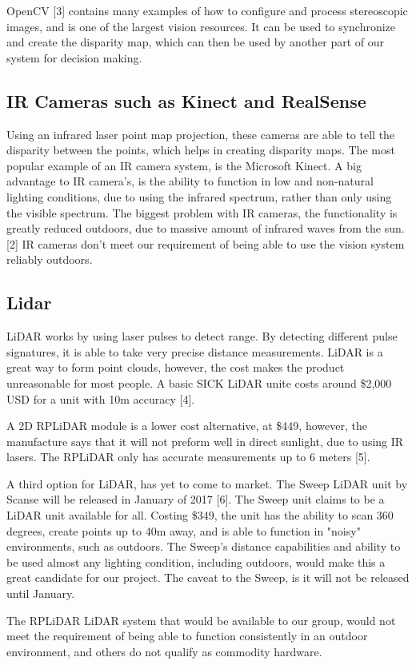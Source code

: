 \documentclass[compsoc,draftclsnofoot,onecolumn,10pt]{IEEEtran}
\begin{document}
OpenCV [3] contains many examples of how to configure and process stereoscopic images, and is one of the largest vision resources. It can be used to synchronize and create the disparity map, which can then be used by another part of our system for decision making. 

\subsection{IR Cameras such as Kinect and RealSense}
Using an infrared laser point map projection, these cameras are able to tell the disparity between the points, which helps in creating disparity maps. The most popular example of an IR camera system, is the Microsoft Kinect. 
A big advantage to IR camera's, is the ability to function in low and non-natural lighting conditions, due to using the infrared spectrum, rather than only using the visible spectrum. 
The biggest problem with IR cameras, the functionality is greatly reduced outdoors, due to massive amount of infrared waves from the sun. [2]
IR cameras don't meet our requirement of being able to use the vision system reliably outdoors.

\subsection{Lidar}
LiDAR works by using laser pulses to detect range. 
By detecting different pulse signatures, it is able to take very precise distance measurements. 
LiDAR is a great way to form point clouds, however, the cost makes the product unreasonable for most people. 
A basic SICK LiDAR unite costs around \$2,000 USD for a unit with 10m accuracy [4].\par
A 2D RPLiDAR module is a lower cost alternative, at \$449, however, the manufacture says that it will not preform well in direct sunlight, due to using IR lasers.   
The RPLiDAR only has accurate measurements up to 6 meters [5].\par
A third option for LiDAR, has yet to come to market. 
The Sweep LiDAR unit by Scanse will be released in January of 2017 [6]. 
The Sweep unit claims to be a LiDAR unit available for all.
Costing \$349, the unit has the ability to scan 360 degrees, create points up to 40m away, and is able to function in "noisy" environments, such as outdoors. 
The Sweep's distance capabilities and ability to be used almost any lighting condition, including outdoors, would make this a great candidate for our project.
The caveat to the Sweep, is it will not be released until January. \par
The RPLiDAR LiDAR system that would be available to our group, would not meet the requirement of being able to function consistently in an outdoor environment, and others do not qualify as commodity hardware. 
\end{document}
